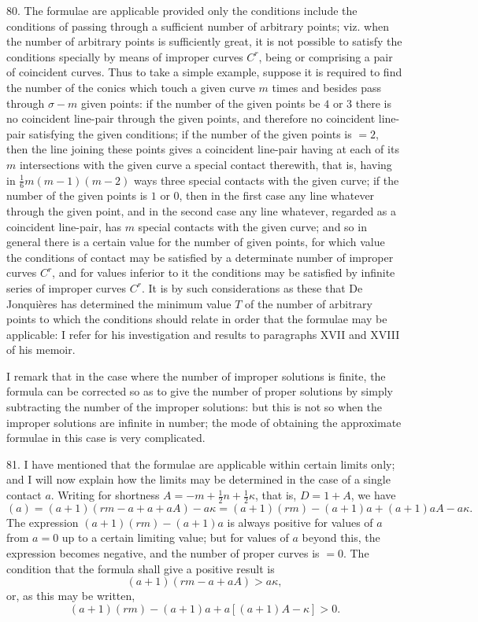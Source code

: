 \documentclass[12pt,a4paper]{article}
\begin{document}
80. The formulae are applicable provided only the conditions include the conditions of passing through a sufficient number of arbitrary points; viz. when the number of arbitrary points is sufficiently great, it is not possible to satisfy the conditions specially by means of improper curves $C^r$, being or comprising a pair of coincident curves. Thus to take a simple example, suppose it is required to find the number of the conics which touch a given curve $m$ times and besides pass through $\sigma - m$ given points: if the number of the given points be $4$ or $3$ there is no coincident line-pair through the given points, and therefore no coincident line-pair satisfying the given conditions; if the number of the given points is $= 2$, then the line joining these points gives a coincident line-pair having at each of its $m$ intersections with the given curve a special contact therewith, that is, having in $\tfrac{1}{6}m(m-1)(m-2)$ ways three special contacts with the given curve; if the number of the given points is $1$ or $0$, then in the first case any line whatever through the given point, and in the second case any line whatever, regarded as a coincident line-pair, has $m$ special contacts with the given curve; and so in general there is a certain value for the number of given points, for which value the conditions of contact may be satisfied by a determinate number of improper curves $C^r$, and for values inferior to it the conditions may be satisfied by infinite series of improper curves $C^r$. It is by such considerations as these that De Jonqui\`eres has determined the minimum value $T$ of the number of arbitrary points to which the conditions should relate in order that the formulae may be applicable: I refer for his investigation and results to paragraphs XVII and XVIII of his memoir.

I remark that in the case where the number of improper solutions is finite, the formula can be corrected so as to give the number of proper solutions by simply subtracting the number of the improper solutions: but this is not so when the improper solutions are infinite in number; the mode of obtaining the approximate formulae in this case is very complicated.

81. I have mentioned that the formulae are applicable within certain limits only; and I will now explain how the limits may be determined in the case of a single contact $a$. Writing for shortness $A = -m + \tfrac{1}{2}n + \tfrac{1}{2}\kappa$, that is, $D = 1 + A$, we have
\[
(a) = (a+1)(rm - a + a + aA) - a\kappa = (a+1)(rm) - (a+1)a + (a+1)aA - a\kappa.
\]
The expression $(a+1)(rm) - (a+1)a$ is always positive for values of $a$ from $a = 0$ up to a certain limiting value; but for values of $a$ beyond this, the expression becomes negative, and the number of proper curves is $= 0$. The condition that the formula shall give a positive result is
\[
(a+1)(rm - a + aA) > a\kappa,
\]
or, as this may be written,
\[
(a+1)(rm) - (a+1)a + a[(a+1)A - \kappa] > 0.
\]
\end{document}
